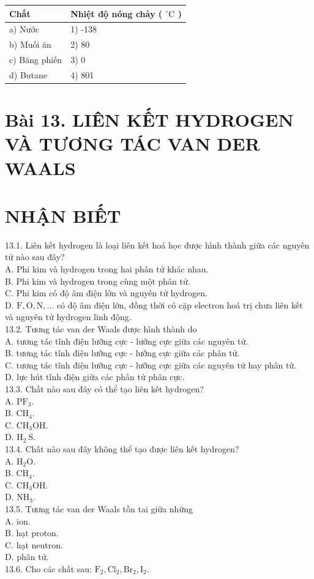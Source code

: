 \documentclass[10pt]{article}
\begin{document}
\begin{center}
\begin{tabular}{|l|l|}
\hline
Chất & Nhiệt độ nóng chảy ( ${ }^{\circ} \mathrm{C}$ ) \\
\hline
a) Nước & 1) -138 \\
\hline
b) Muối ăn & 2) 80 \\
\hline
c) Băng phiến & 3) 0 \\
\hline
d) Butane & 4) 801 \\
\hline
\end{tabular}
\end{center}

\section*{Bài 13. LIÊN KẾT HYDROGEN VÀ TƯƠNG TÁC VAN DER WAALS}
\section*{NHẬN BIẾT}
13.1. Liên kết hydrogen là loại liên kết hoá học được hình thành giữa các nguyên tử nào sau đây?\\
A. Phi kim và hydrogen trong hai phân tử khác nhau.\\
B. Phi kim và hydrogen trong cùng một phân tử.\\
C. Phi kim có độ âm điện lớn và nguyên tử hydrogen.\\
D. $\mathrm{F}, \mathrm{O}, \mathrm{N}, \ldots$ có độ âm điện lớn, đồng thời có cặp electron hoá trị chưa liên kết và nguyên tử hydrogen linh động.\\
13.2. Tương tác van der Waals được hình thành do\\
A. tương tác tĩnh điện lưỡng cực - lưỡng cực giữa các nguyên tử.\\
B. tương tác tĩnh điện lưỡng cực - lưỡng cực giữa các phân tử.\\
C. tương tác tĩnh điện lưỡng cực - lưỡng cực giữa các nguyên tử hay phân tử.\\
D. lực hút tĩnh điện giữa các phân tử phân cực.\\
13.3. Chất nào sau đây có thể tạo liên kết hydrogen?\\
A. $\mathrm{PF}_{3}$.\\
B. $\mathrm{CH}_{4}$.\\
C. $\mathrm{CH}_{3} \mathrm{OH}$.\\
D. $\mathrm{H}_{2} \mathrm{~S}$.\\
13.4. Chất nào sau đây không thể tạo được liên kết hydrogen?\\
A. $\mathrm{H}_{2} \mathrm{O}$.\\
B. $\mathrm{CH}_{4}$.\\
C. $\mathrm{CH}_{3} \mathrm{OH}$.\\
D. $\mathrm{NH}_{3}$.\\
13.5. Tương tác van der Waals tồn tai giữa những\\
A. ion.\\
B. hạt proton.\\
C. hạt neutron.\\
D. phân tử.\\
13.6. Cho các chất sau: $\mathrm{F}_{2}, \mathrm{Cl}_{2}, \mathrm{Br}_{2}, \mathrm{I}_{2}$.
\end{document}
